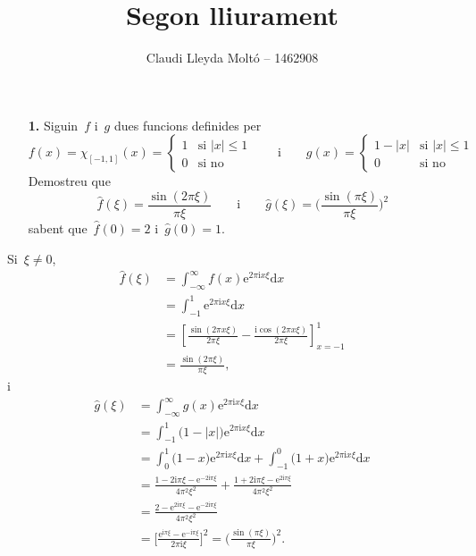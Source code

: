 \documentclass[a4paper]{article}
\title{Segon lliurament}
\author{Claudi Lleyda Moltó -- 1462908}
\theoremstyle{definition}
\newcommand{\iu}{\mathrm{i}}
\newcommand{\e}{\mathrm{e}}
\providecommand{\uppi}{\pi}
\newcommand{\diff}{\mathrm{d}}
\newcommand{\abs}[1]{\lvert{#1}\rvert}
\begin{document}
\maketitle

\begin{enumerate}
    \item[\textbf{1.}] Siguin~\(f\) i~\(g\) dues funcions definides per
        \[
            f(x) = \chi_{[-1,1]}(x) = \begin{cases}
                1 & \text{si } \abs{x} \leq 1 \\
                0 & \text{si no}
            \end{cases}
            \qquad\text{i}\qquad
            g(x) = \begin{cases}
                1 - \abs{x} & \text{si } \abs{x} \leq 1 \\
                0 & \text{si no}
            \end{cases}
        \]
        Demostreu que
        \[
            \widehat{f}(\xi) = \frac{\sin(2\uppi\xi)}{\uppi\xi}
            \qquad\text{i}\qquad
            \widehat{g}(\xi) = \biggl(\frac{\sin(\uppi\xi)}{\uppi\xi}\biggr)^{2}
        \]
        sabent que~\(\widehat{f}(0) = 2\) i~\(\widehat{g}(0) = 1\).
\end{enumerate}

Si~\(\xi \neq 0\),
\begin{align*}
    \widehat{f}(\xi) &= \int_{-\infty}^{\infty}
                        f(x) \e^{2\uppi\iu x\xi}\diff x \\
                     &= \int_{-1}^{1}
                        \e^{2\uppi\iu x\xi} \diff x \\
                     &= \left[
                         \frac{\sin(2\uppi x\xi)}{2\uppi\xi}
                         - \frac{\iu\cos(2\uppi x\xi)}{2\uppi\xi}
                     \right]_{x = -1}^{1}\\
                     &= \frac{\sin(2\uppi\xi)}{\uppi\xi},
\end{align*}
i
\begin{align*}
    \widehat{g}(\xi) &= \int_{-\infty}^{\infty}
                        g(x) \e^{2\uppi\iu x\xi}\diff x \\
                     &= \int_{-1}^{1}
                        \bigl(1-\abs{x}\bigr) \e^{2\uppi\iu x\xi}\diff x \\
                     &= \int_{0}^{1}
                        \bigl(1-x\bigr) \e^{2\uppi\iu x\xi}\diff x
                      + \int_{-1}^{0}
                        \bigl(1+x\bigr) \e^{2\uppi\iu x\xi}\diff x \\
                     &= \frac{1-2\iu\uppi\xi-\e^{-2\iu\uppi\xi}}{4\uppi^{2}\xi^{2}}
                      + \frac{1+2\iu\uppi\xi-\e^{2\iu\uppi\xi}}{4\uppi^{2}\xi^{2}} \\
                     &= \frac{2-\e^{2\iu\uppi\xi}-\e^{-2\iu\uppi\xi}}{4\uppi^{2}\xi^{2}} \\
                     &= \biggl[
                        \frac{\e^{\iu\uppi\xi}-\e^{-\iu\uppi\xi}}{2\uppi\iu\xi}
                        \biggr]^{2}
                      = \biggl(\frac{\sin(\uppi\xi)}{\uppi\xi}\biggr)^{2}.
\end{align*}
\end{document}
